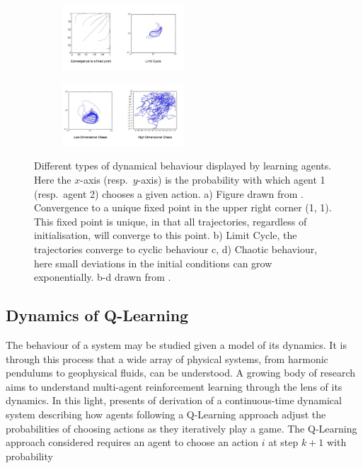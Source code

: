 \documentclass[sigconf,anonymous]{aamas}
\begin{document}
    \begin{figure}[h]
        \centering
        
        \begin{subfigure}[b]{0.9 \textwidth}
        \includegraphics[width=0.5\textwidth]{Figures/DynamicalBehavioursTop.png}
        \end{subfigure}
        
        \begin{subfigure}[b]{0.9 \textwidth}
        \includegraphics[width=0.5\textwidth]{Figures/DynamicalBehaviourschaos.png}
        \end{subfigure}
        
        \caption{ \label{fig::DynamicalBehaviours} Different types of dynamical behaviour
       displayed
        by learning agents. Here the $x$-axis (resp.~$y$-axis) is the probability with which agent 1 (resp.~agent 2) chooses a given action. a) Figure drawn from \cite{Tuyls2006AnGames}.
        Convergence
        to a unique fixed point in the upper right corner (1, 1). This fixed point is unique, in
        that all trajectories, regardless of initialisation, will converge to this point. b) Limit Cycle, the trajectories converge to cyclic behaviour c,
        d) Chaotic behaviour, here small deviations in the initial conditions can grow
        exponentially. b-d drawn from \cite{Sanders2018}.}
    \end{figure}

\subsection{Dynamics of Q-Learning}

The behaviour of a system may be studied given a model of its
dynamics. It is through this process that a wide array of physical
systems, from harmonic pendulums to geophysical fluids, can be
understood. A growing body of research aims to understand multi-agent
reinforcement learning through the lens of its dynamics. In this
light, \cite{Tuyls2006AnGames} presents of derivation of a continuous-time dynamical system describing how agents following a Q-Learning
approach adjust the probabilities of choosing actions as they
iteratively play a game. The Q-Learning approach considered requires
an agent to choose an action $i$ at step $k+1$ with probability
\end{document}
